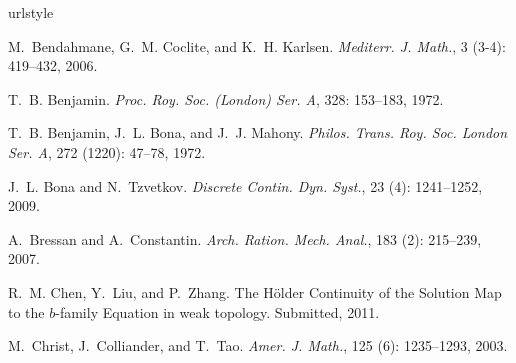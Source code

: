 \documentclass[final]{thesis}
\begin{document}
\mainmatter


%

\backmatter              %
\begin{thebibliography}{35}
\providecommand{\natexlab}[1]{#1}
\providecommand{\url}[1]{\texttt{#1}}
\expandafter\ifx\csname urlstyle\endcsname\relax
  \providecommand{\doi}[1]{doi: #1}\else
  \providecommand{\doi}{doi: \begingroup \urlstyle{rm}\Url}\fi

  \singlespace
{}
M.~Bendahmane, G.~M. Coclite, and K.~H. Karlsen.
\newblock \emph{Mediterr. J. Math.}, 3 (3-4): 419--432, 2006.

T.~B. Benjamin.
\newblock \emph{Proc. Roy. Soc. (London) Ser. A}, 328: 153--183, 1972.

T.~B. Benjamin, J.~L. Bona, and J.~J. Mahony.
\newblock \emph{Philos. Trans. Roy. Soc. London Ser. A}, 272
  (1220): 47--78, 1972.

J.~L. Bona and N.~Tzvetkov.
\newblock \emph{Discrete Contin. Dyn. Syst.}, 23 (4):
  1241--1252, 2009.

A.~Bressan and A.~Constantin.
\newblock \emph{Arch. Ration. Mech. Anal.}, 183 (2):
  215--239, 2007.

R.~M. Chen, Y.~Liu, and P.~Zhang.
\newblock The H\"{o}lder Continuity of the Solution Map to the $b$-family
  Equation in weak topology.
\newblock Submitted, 2011.

M.~Christ, J.~Colliander, and T.~Tao.
\newblock \emph{Amer. J. Math.}, 125 (6): 1235--1293, 2003.


\end{thebibliography}
\end{document}
